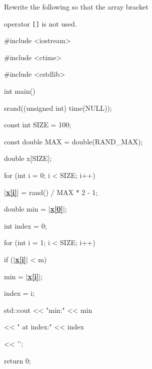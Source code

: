 Rewrite the following so that the array bracket

operator \texttt{[]} is not used.



\begin{consolethree}[escapeinside=||]

#include <iostream>

#include <ctime>

#include <cstdlib>

int main()

{

    srand((unsigned int) time(NULL));

    const int SIZE = 100;

    const double MAX = double(RAND_MAX);

    double x[SIZE];

    for (int i = 0; i < SIZE; i++)

    {

        |\textbf{\underline{x[i]}}| = rand() / MAX * 2 - 1;

    }

    double min = |\textbf{\underline{x[0]}}|;

    int index = 0;

    for (int i = 1; i < SIZE; i++)

    {

        if (|\textbf{\underline{x[i]}}| < m)

        {

            min = |\textbf{\underline{x[i]}}|;

            index = i;

        }

    }

    std::cout << "min:" << min

              << " at index:" << index

              << '\n';

    return 0;

}

\end{consolethree}

